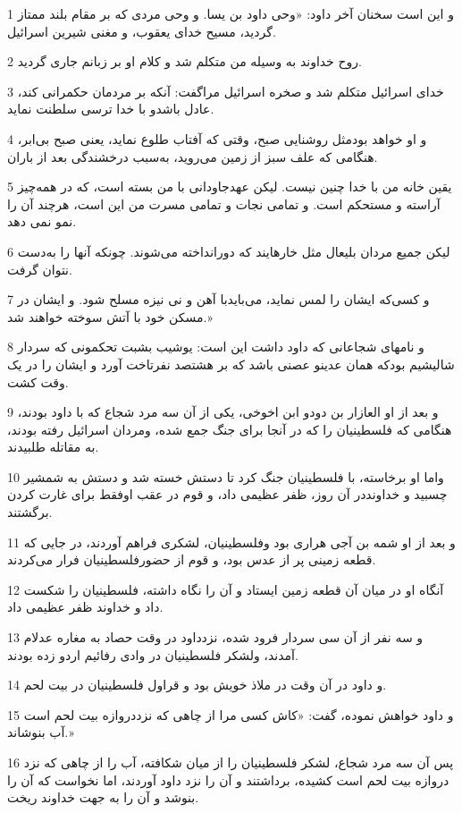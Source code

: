\par 1 و این است سخنان آخر داود: «وحی داود بن یسا. و وحی مردی که بر مقام بلند ممتاز گردید، مسیح خدای یعقوب، و مغنی شیرین اسرائیل.
\par 2 روح خداوند به وسیله من متکلم شد و کلام او بر زبانم جاری گردید.
\par 3 خدای اسرائیل متکلم شد و صخره اسرائیل مراگفت: آنکه بر مردمان حکمرانی کند، عادل باشدو با خدا ترسی سلطنت نماید.
\par 4 و او خواهد بودمثل روشنایی صبح، وقتی که آفتاب طلوع نماید، یعنی صبح بی‌ابر، هنگامی که علف سبز از زمین می‌روید، به‌سبب درخشندگی بعد از باران.
\par 5 یقین خانه من با خدا چنین نیست. لیکن عهدجاودانی با من بسته است، که در همه‌چیز آراسته و مستحکم است. و تمامی نجات و تمامی مسرت من این است، هرچند آن را نمو نمی دهد.
\par 6 لیکن جمیع مردان بلیعال مثل خارهایند که دورانداخته می‌شوند. چونکه آنها را به‌دست نتوان گرفت.
\par 7 و کسی‌که ایشان را لمس نماید، می‌بایدبا آهن و نی نیزه مسلح شود. و ایشان در مسکن خود با آتش سوخته خواهند شد.»
\par 8 و نامهای شجاعانی که داود داشت این است: یوشیب بشبت تحکمونی که سردار شالیشیم بودکه همان عدینو عصنی باشد که بر هشتصد نفرتاخت آورد و ایشان را در یک وقت کشت.
\par 9 و بعد از او العازار بن دودو ابن اخوخی، یکی از آن سه مرد شجاع که با داود بودند، هنگامی که فلسطینیان را که در آنجا برای جنگ جمع شده، ومردان اسرائیل رفته بودند، به مقاتله طلبیدند.
\par 10 واما او برخاسته، با فلسطینیان جنگ کرد تا دستش خسته شد و دستش به شمشیر چسبید و خداونددر آن روز، ظفر عظیمی داد، و قوم در عقب اوفقط برای غارت کردن برگشتند.
\par 11 و بعد از او شمه بن آجی هراری بود وفلسطینیان، لشکری فراهم آوردند، در جایی که قطعه زمینی پر از عدس بود، و قوم از حضورفلسطینیان فرار می‌کردند.
\par 12 آنگاه او در میان آن قطعه زمین ایستاد و آن را نگاه داشته، فلسطینیان را شکست داد و خداوند ظفر عظیمی داد.
\par 13 و سه نفر از آن سی سردار فرود شده، نزدداود در وقت حصاد به مغاره عدلام آمدند، ولشکر فلسطینیان در وادی رفائیم اردو زده بودند.
\par 14 و داود در آن وقت در ملاذ خویش بود و قراول فلسطینیان در بیت لحم.
\par 15 و داود خواهش نموده، گفت: «کاش کسی مرا از چاهی که نزددروازه بیت لحم است آب بنوشاند.»
\par 16 پس آن سه مرد شجاع، لشکر فلسطینیان را از میان شکافته، آب را از چاهی که نزد دروازه بیت لحم است کشیده، برداشتند و آن را نزد داود آوردند، اما نخواست که آن را بنوشد و آن را به جهت خداوند ریخت.
